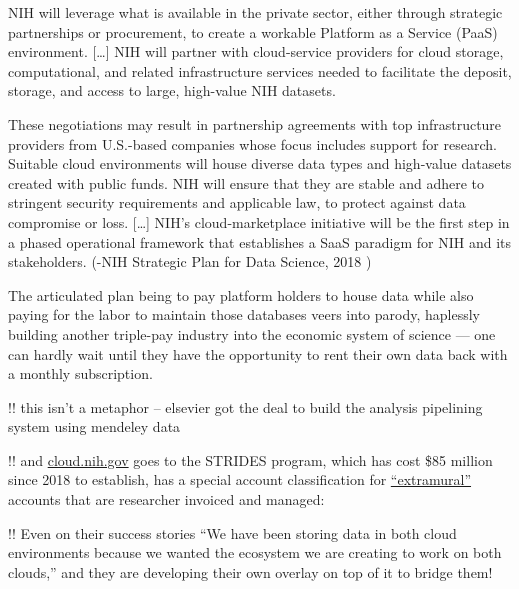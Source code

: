 \documentclass[10pt]{article}
\begin{document}
\begin{multicols}{2}
\begin{leftbar}
NIH will leverage what is available in the private sector, either
through strategic partnerships or procurement, to create a workable
Platform as a Service (PaaS) environment. {[}\ldots{]} NIH will partner
with cloud-service providers for cloud storage, computational, and
related infrastructure services needed to facilitate the deposit,
storage, and access to large, high-value NIH datasets.

These negotiations may result in partnership agreements with top
infrastructure providers from U.S.-based companies whose focus includes
support for research. Suitable cloud environments will house diverse
data types and high-value datasets created with public funds. NIH will
ensure that they are stable and adhere to stringent security
requirements and applicable law, to protect against data compromise or
loss. {[}\ldots{]} NIH's cloud-marketplace initiative will be the first
step in a phased operational framework that establishes a SaaS paradigm
for NIH and its stakeholders. (-NIH Strategic Plan for Data Science,
2018 \cite{NIHStrategicPlan2018} )
\end{leftbar}

The articulated plan being to pay platform holders to house data while
also paying for the labor to maintain those databases veers into parody,
haplessly building another triple-pay industry \cite{buranyiStaggeringlyProfitableBusiness2017}  into the economic system
of science --- one can hardly wait until they have the opportunity to
rent their own data back with a monthly subscription.

!! this isn't a metaphor -- elsevier got the deal to build the analysis
pipelining system using mendeley data \cite{ElsevierSevenBridges2017} 

!! and
\href{https://web.archive.org/web/20210729131920/https://cloud.nih.gov/}{cloud.nih.gov}
goes to the STRIDES program, which has cost \$85 million since 2018 to
establish, has a special account classification for
\href{https://web.archive.org/web/20211006003547/https://cloud.nih.gov/enrollment/account-type/}{``extramural''}
accounts that are researcher invoiced and managed:\\
\cite{reillyNIHSTRIDESInitiative2021} 

!! Even on their success stories ``We have been storing data in both
cloud environments because we wanted the ecosystem we are creating to
work on both clouds,'' and they are developing their own overlay on top
of it to bridge them! \cite{STRIDESInitiativeSuccess2020} 


\end{multicols}
\end{document}
